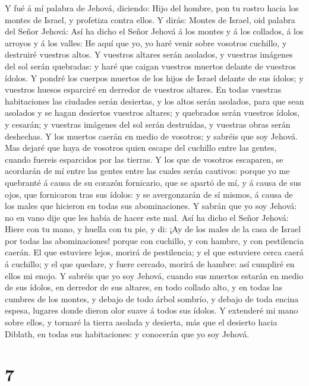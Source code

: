  Y fué á mí palabra de Jehová, diciendo: 
Hijo del hombre, pon tu rostro hacia los montes de Israel, y profetiza
contra ellos.  Y dirás: Montes de Israel, oid palabra del
Señor Jehová: Así ha dicho el Señor Jehová á los montes y á los
collados, á los arroyos y á los valles: He aquí que yo, yo haré venir
sobre vosotros cuchillo, y destruiré vuestros altos.  Y
vuestros altares serán asolados, y vuestras imágenes del sol serán
quebradas: y haré que caigan vuestros muertos delante de vuestros
ídolos.  Y pondré los cuerpos muertos de los hijos de
Israel delante de sus ídolos; y vuestros huesos esparciré en derredor de
vuestros altares.  En todas vuestras habitaciones las
ciudades serán desiertas, y los altos serán asolados, para que sean
asolados y se hagan desiertos vuestros altares; y quebrados serán
vuestros ídolos, y cesarán; y vuestras imágenes del sol serán
destruídas, y vuestras obras serán deshechas.  Y los
muertos caerán en medio de vosotros; y sabréis que soy Jehová.
 Mas dejaré que haya de vosotros quien escape del cuchillo
entre las gentes, cuando fuereis esparcidos por las tierras.
 Y los que de vosotros escaparen, se acordarán de mí entre
las gentes entre las cuales serán cautivos: porque yo me quebranté á
causa de su corazón fornicario, que se apartó de mí, y á causa de sus
ojos, que fornicaron tras sus ídolos: y se avergonzarán de sí mismos, á
causa de los males que hicieron en todas sus abominaciones.
 Y sabrán que yo soy Jehová: no en vano dije que les
había de hacer este mal.  Así ha dicho el Señor Jehová:
Hiere con tu mano, y huella con tu pie, y di: ¡Ay de los males de la
casa de Israel por todas las abominaciones! porque con cuchillo, y con
hambre, y con pestilencia caerán.  El que estuviere
lejos, morirá de pestilencia; y el que estuviere cerca caerá á cuchillo;
y el que quedare, y fuere cercado, morirá de hambre: así cumpliré en
ellos mi enojo.  Y sabréis que yo soy Jehová, cuando sus
muertos estarán en medio de sus ídolos, en derredor de sus altares, en
todo collado alto, y en todas las cumbres de los montes, y debajo de
todo árbol sombrío, y debajo de toda encina espesa, lugares donde dieron
olor suave á todos sus ídolos.  Y extenderé mi mano sobre
ellos, y tornaré la tierra asolada y desierta, más que el desierto hacia
Diblath, en todas sus habitaciones: y conocerán que yo soy Jehová.

\hypertarget{section-6}{%
\section{7}\label{section-6}}

